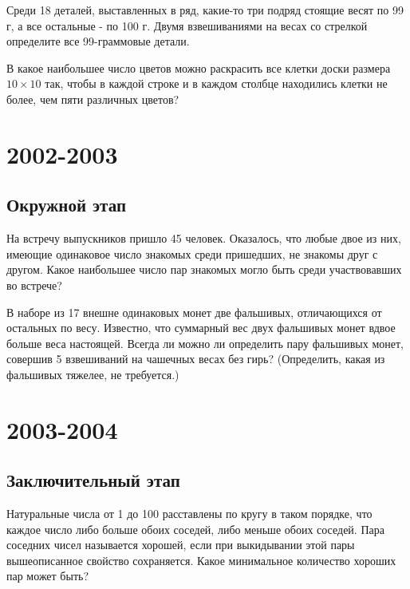 \documentclass[11pt, a4paper]{common/document_template}
\begin{document}
\begin{exercise}
Среди 18 деталей, выставленных в ряд, какие-то три подряд стоящие весят по 99 г, а все остальные - по 100 г. Двумя взвешиваниями на весах со стрелкой определите все 99-граммовые детали.
\end{exercise}

\begin{exercise}
В какое наибольшее число цветов можно раскрасить все клетки доски размера $10 \times 10$ так, чтобы в каждой строке и в каждом столбце находились клетки не более, чем пяти различных цветов?
\end{exercise}

\chapter{2002-2003}

\section{Окружной этап}

\begin{exercise}
На встречу выпускников пришло 45 человек. Оказалось, что любые двое из них, имеющие одинаковое число знакомых среди пришедших, не знакомы друг с другом. Какое наибольшее число пар знакомых могло быть среди участвовавших во встрече?
\end{exercise}

\begin{exercise}
В наборе из 17 внешне одинаковых монет две фальшивых, отличающихся от остальных по весу. Известно, что суммарный вес двух фальшивых монет вдвое больше веса настоящей. Всегда ли можно ли определить пару фальшивых монет, совершив 5 взвешиваний на чашечных весах без гирь? (Определить, какая из фальшивых тяжелее, не требуется.)
\end{exercise}


\chapter{2003-2004}

\section{Заключительный этап}

\begin{exercise}
Натуральные числа от 1 до 100 расставлены по кругу в таком порядке, что каждое число либо больше обоих соседей, либо меньше обоих соседей. Пара соседних чисел называется хорошей, если при выкидывании этой пары вышеописанное свойство сохраняется. Какое минимальное
количество хороших пар может быть?
\end{exercise}
\end{document}
